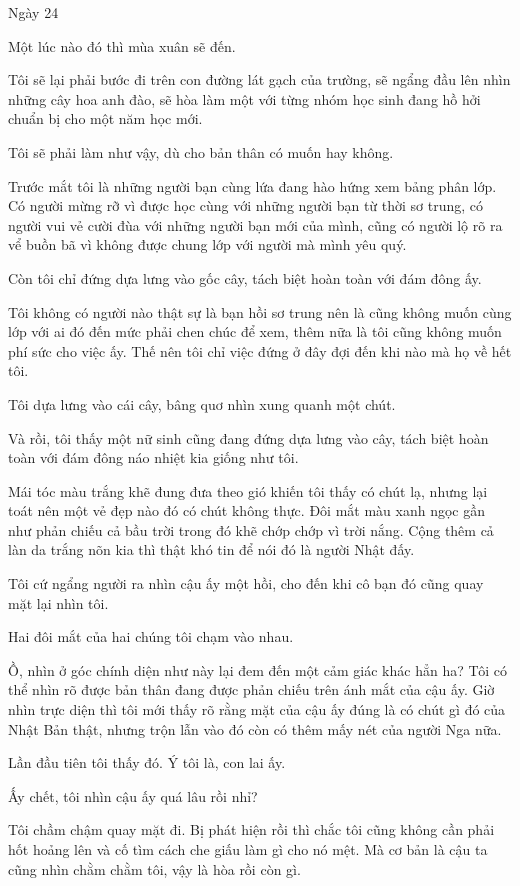 {Ngày 24}
{
Một lúc nào đó thì mùa xuân sẽ đến.

Tôi sẽ lại phải bước đi trên con đường lát gạch của trường, sẽ ngẩng đầu
lên nhìn những cây hoa anh đào, sẽ hòa làm một với từng nhóm học sinh
đang hồ hởi chuẩn bị cho một năm học mới.

Tôi sẽ phải làm như vậy, dù cho bản thân có muốn hay không.

Trước mắt tôi là những người bạn cùng lứa đang hào hứng xem bảng phân
lớp. Có người mừng rỡ vì được học cùng với những người bạn từ thời sơ
trung, có người vui vẻ cười đùa với những người bạn mới của mình, cũng
có người lộ rõ ra vể buồn bã vì không được chung lớp với người mà mình
yêu quý.

Còn tôi chỉ đứng dựa lưng vào gốc cây, tách biệt hoàn toàn với đám đông
ấy.

Tôi không có người nào thật sự là bạn hồi sơ trung nên là cũng không
muốn cùng lớp với ai đó đến mức phải chen chúc để xem, thêm nữa là tôi
cũng không muốn phí sức cho việc ấy. Thế nên tôi chỉ việc đứng ở đây đợi
đến khi nào mà họ về hết tôi.

Tôi dựa lưng vào cái cây, bâng quơ nhìn xung quanh một chút.

Và rồi, tôi thấy một nữ sinh cũng đang đứng dựa lưng vào cây, tách biệt
hoàn toàn với đám đông náo nhiệt kia giống như tôi.

Mái tóc màu trắng khẽ đung đưa theo gió khiến tôi thấy có chút lạ, nhưng
lại toát nên một vẻ đẹp nào đó có chút không thực. Đôi mắt màu xanh ngọc
gần như phản chiếu cả bầu trời trong đó khẽ chớp chớp vì trời nắng. Cộng
thêm cả làn da trắng nõn kia thì thật khó tin để nói đó là người Nhật
đấy.

Tôi cứ ngẩng người ra nhìn cậu ấy một hồi, cho đến khi cô bạn đó cũng
quay mặt lại nhìn tôi.

Hai đôi mắt của hai chúng tôi chạm vào nhau.

Ồ, nhìn ở góc chính diện như này lại đem đến một cảm giác khác hẳn ha?
Tôi có thể nhìn rõ được bản thân đang được phản chiếu trên ánh mắt của
cậu ấy. Giờ nhìn trực diện thì tôi mới thấy rõ rằng mặt của cậu ấy đúng
là có chút gì đó của Nhật Bản thật, nhưng trộn lẫn vào đó còn có thêm
mấy nét của người Nga nữa.

Lần đầu tiên tôi thấy đó. Ý tôi là, con lai ấy.

Ấy chết, tôi nhìn cậu ấy quá lâu rồi nhỉ?

Tôi chầm chậm quay mặt đi. Bị phát hiện rồi thì chắc tôi cũng không cần
phải hốt hoảng lên và cố tìm cách che giấu làm gì cho nó mệt. Mà cơ bản
là cậu ta cũng nhìn chằm chằm tôi, vậy là hòa rồi còn gì.

}
